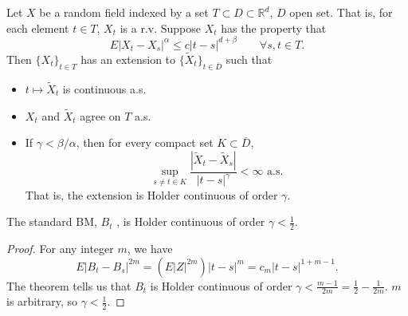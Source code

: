 \begin{theorem}
	Let $X$ be a random field indexed by a set $T \subset D \subset  \mathbb{R}^d$, $D$ open set. That is, for each element $t \in T$, $X_t$ is a r.v. Suppose $X_t$ has the property that
	\[
		E\left| X_t - X_s \right| ^\alpha
		\le  c \left| t - s \right| ^{d + \beta} 
		\qquad \forall s, t \in T
	.\] 
	Then $\{X_t\} _{t \in T}$ has an extension to $\{\tilde X_t\} _{t \in \overline{D} }$ such that
	\begin{itemize}
		\item $t \mapsto \tilde X_t$ is continuous a.s.
		\item  $X_t$ and $\tilde X_t$ agree on $T$ a.s.
		\item If $\gamma < \beta / \alpha$, then for every compact set $K \subset \overline{D} $, 
			\[
				\sup _{s \neq t \in K} \frac{\left| \tilde X_t - \tilde X_s \right| }{|t - s|^\gamma} < \infty  \text{ a.s}
			.\] 
			That is, the extension is Holder continuous of order $\gamma$.
	\end{itemize}
\end{theorem}
\begin{corollary}
	The standard BM, $B_t$ , is Holder continuous of order $\gamma < \frac{1}{2}$.
\end{corollary}
\begin{proof}
	For any integer $m$, we have
	\[
		E\left| B_t - B_s \right| ^{2 m}
		= \left( E|Z|^{2m} \right) |t - s|^m
		= c_m |t - s| ^{1 + m - 1}
	.\] 
	The theorem tells us that $B_t$ is Holder continuous of order $\gamma < \frac{m - 1}{2 m} = \frac{1}{2} - \frac{1}{2m}$. $m$ is arbitrary, so $\gamma < \frac{1}{2}$.
\end{proof}

